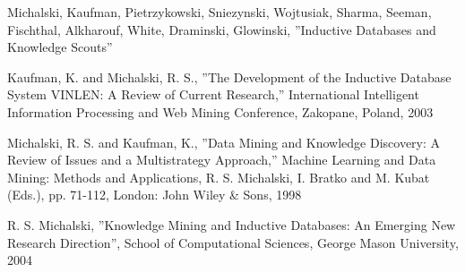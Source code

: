 \begin{thebibliography}{99}
 {Michalski, Kaufman, Pietrzykowski, Sniezynski,
    Wojtusiak, Sharma, Seeman, Fischthal, Alkharouf, White, Draminski,
    Glowinski, ''Inductive Databases and Knowledge Scouts''}

 {Kaufman, K. and Michalski, R. S., ''The Development
    of the Inductive Database System VINLEN: A Review of Current
    Research,'' International Intelligent Information Processing and
    Web Mining Conference, Zakopane, Poland, 2003}

 {Michalski, R. S. and Kaufman, K., ''Data Mining and
    Knowledge Discovery: A Review of Issues and a Multistrategy
    Approach,'' Machine Learning and Data Mining: Methods and
    Applications, R. S. Michalski, I. Bratko and M.  Kubat (Eds.), pp.
    71-112, London: John Wiley \& Sons, 1998}

 {R. S. Michalski, ''Knowledge Mining and Inductive
    Databases: An Emerging New Research Direction'', School of
    Computational Sciences, George Mason University, 2004}
    


\end{thebibliography}